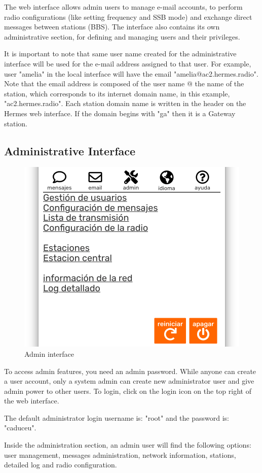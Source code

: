 \documentclass[11pt,a4paper]{article}
\begin{document}
The web interface allows admin users to manage e-mail accounts, to perform radio configurations (like setting frequency and SSB mode) and exchange direct messages between stations (BBS). The interface also contains its own administrative section, for defining and managing users and their privileges. 

It is important to note that same user name created for the administrative interface will be used for the e-mail address assigned to that user.  For example, user "amelia" in the local interface will have the email "amelia@ac2.hermes.radio". Note that the email address is composed of the user name @ the name of the station, which corresponds to its internet domain name, in this example, "ac2.hermes.radio". Each station domain name is written in the header on the Hermes web interface. If the domain begins with "ga" then it is a Gateway station.

\subsection{Administrative Interface}
\label{admininterface}

\begin{figure}[H]
    \centering
    \includegraphics[width=0.5\columnwidth]{screenshots/frontend/es/admin.png}
    \caption{Admin interface}
    \label{fig:admin}
\end{figure}

To access admin features, you need an admin password. While anyone can create a user account, only a system admin can create new administrator user and give admin power to other users. To login, click on the login icon on the top right of the web interface. 

The default administrator login username is: "root" and the password is: "caduceu".

Inside the administration section, an admin user will find the following options: user management, messages administration, network information, stations, detailed log and radio configuration.
\end{document}
